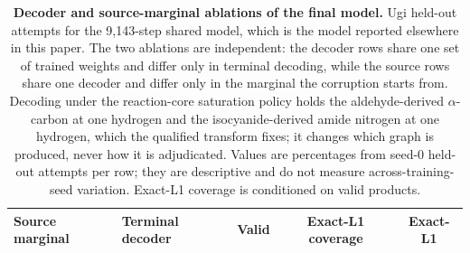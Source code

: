 \documentclass{article}
\begin{document}
\begin{table}[t]
\caption{\textbf{Matched shared-model production comparison across reaction programs.}
Point estimates report the mean across three independent seeds; the exact-L1 column additionally
reports the sample standard deviation. Paired contrasts are summarized by their three seed values,
mean and observed range; individual seed values appear in the supplement.
Validity and connectedness use all generation attempts as the denominator.
Decomposition coverage, replay precision, abstention and ambiguity retain their prespecified
conditional denominators. Novelty is conditioned on valid products or unique returned
decompositions, as appropriate. Fraction pairs and exact-L1 yield are percentages; diversity is
mean pairwise ECFP4 distance and $N_{\mathrm{eff}}$ is the effective generated-component count.
Results are never pooled across reaction programs.}
\label{tab:production-comparison}
\centering
\scriptsize
\setlength{\tabcolsep}{3.5pt}
\end{table}

\begin{table}[H]
\caption{\textbf{Decoder and source-marginal ablations of the final model.} Ugi held-out attempts
for the 9,143-step shared model, which is the model reported elsewhere in this paper. The two
ablations are independent: the decoder rows share one set of trained weights and differ only in
terminal decoding, while the source rows share one decoder and differ only in the marginal the
corruption starts from. Decoding under the reaction-core saturation policy holds the aldehyde-derived
$\alpha$-carbon at one hydrogen and the isocyanide-derived amide nitrogen at one hydrogen, which the
qualified transform fixes; it changes which graph is produced, never how it is adjudicated. Values
are percentages from \ForgeProseAttemptsPerProgram{} seed-0 held-out attempts per row; they are descriptive and do not measure
across-training-seed variation. Exact-L1 coverage is conditioned on valid products.}
\label{tab:decoder-source-ablation}
\centering
\scriptsize
\setlength{\tabcolsep}{5pt}
\begin{tabular}{@{}llccc@{}}
\toprule
Source marginal & Terminal decoder & Valid & Exact-L1 coverage & Exact-L1 \\
\midrule
\end{tabular}
\end{table}
\end{document}
